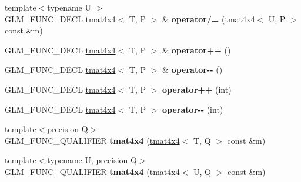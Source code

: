 \begin{DoxyCompactItemize}
\item 
\hypertarget{structglm_1_1detail_1_1tmat4x4_a642293b379d24a91960b55e9eb2da91b}{{\footnotesize template$<$typename U $>$ }\\G\-L\-M\-\_\-\-F\-U\-N\-C\-\_\-\-D\-E\-C\-L \hyperlink{structglm_1_1detail_1_1tmat4x4}{tmat4x4}$<$ T, P $>$ \& {\bfseries operator/=} (\hyperlink{structglm_1_1detail_1_1tmat4x4}{tmat4x4}$<$ U, P $>$ const \&m)}\label{structglm_1_1detail_1_1tmat4x4_a642293b379d24a91960b55e9eb2da91b}

\item 
\hypertarget{structglm_1_1detail_1_1tmat4x4_a4d6675dbac8dc446236babedc6c2642c}{G\-L\-M\-\_\-\-F\-U\-N\-C\-\_\-\-D\-E\-C\-L \hyperlink{structglm_1_1detail_1_1tmat4x4}{tmat4x4}$<$ T, P $>$ \& {\bfseries operator++} ()}\label{structglm_1_1detail_1_1tmat4x4_a4d6675dbac8dc446236babedc6c2642c}

\item 
\hypertarget{structglm_1_1detail_1_1tmat4x4_a6a724eae9119c2724ccfdb3f418ab31b}{G\-L\-M\-\_\-\-F\-U\-N\-C\-\_\-\-D\-E\-C\-L \hyperlink{structglm_1_1detail_1_1tmat4x4}{tmat4x4}$<$ T, P $>$ \& {\bfseries operator-\/-\/} ()}\label{structglm_1_1detail_1_1tmat4x4_a6a724eae9119c2724ccfdb3f418ab31b}

\item 
\hypertarget{structglm_1_1detail_1_1tmat4x4_afa478e500f09b50da702a53b3f788c0d}{G\-L\-M\-\_\-\-F\-U\-N\-C\-\_\-\-D\-E\-C\-L \hyperlink{structglm_1_1detail_1_1tmat4x4}{tmat4x4}$<$ T, P $>$ {\bfseries operator++} (int)}\label{structglm_1_1detail_1_1tmat4x4_afa478e500f09b50da702a53b3f788c0d}

\item 
\hypertarget{structglm_1_1detail_1_1tmat4x4_a38f9e3d1a2d4b37646311ce7a798aacd}{G\-L\-M\-\_\-\-F\-U\-N\-C\-\_\-\-D\-E\-C\-L \hyperlink{structglm_1_1detail_1_1tmat4x4}{tmat4x4}$<$ T, P $>$ {\bfseries operator-\/-\/} (int)}\label{structglm_1_1detail_1_1tmat4x4_a38f9e3d1a2d4b37646311ce7a798aacd}

\item 
\hypertarget{structglm_1_1detail_1_1tmat4x4_aee39aabdc85b598efc2fa0f515bd7228}{{\footnotesize template$<$precision Q$>$ }\\G\-L\-M\-\_\-\-F\-U\-N\-C\-\_\-\-Q\-U\-A\-L\-I\-F\-I\-E\-R {\bfseries tmat4x4} (\hyperlink{structglm_1_1detail_1_1tmat4x4}{tmat4x4}$<$ T, Q $>$ const \&m)}\label{structglm_1_1detail_1_1tmat4x4_aee39aabdc85b598efc2fa0f515bd7228}

\item 
\hypertarget{structglm_1_1detail_1_1tmat4x4_acd4383cfa5e9463cb5d2e791b34a2a46}{{\footnotesize template$<$typename U, precision Q$>$ }\\G\-L\-M\-\_\-\-F\-U\-N\-C\-\_\-\-Q\-U\-A\-L\-I\-F\-I\-E\-R {\bfseries tmat4x4} (\hyperlink{structglm_1_1detail_1_1tmat4x4}{tmat4x4}$<$ U, Q $>$ const \&m)}\label{structglm_1_1detail_1_1tmat4x4_acd4383cfa5e9463cb5d2e791b34a2a46}


\end{DoxyCompactItemize}
